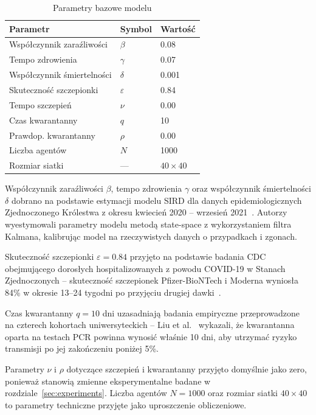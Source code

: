 \documentclass[polish]{projectreport}
\begin{document}
\begin{table}[H]
\centering
\caption{Parametry bazowe modelu}
\begin{tabularx}{\columnwidth}{@{}llY@{}} \toprule
\textbf{Parametr} & \textbf{Symbol} & \textbf{Wartość} \\ \midrule
Współczynnik zaraźliwości  & $\beta$    & 0.08 \\
Tempo zdrowienia           & $\gamma$   & 0.07 \\
Współczynnik śmiertelności & $\delta$   & 0.001 \\
Skuteczność szczepionki    & $\varepsilon$ & 0.84 \\
Tempo szczepień            & $\nu$      & 0.00 \\
Czas kwarantanny           & $q$        & 10 \\
Prawdop. kwarantanny       & $\rho$     & 0.00 \\
Liczba agentów             & $N$        & 1000 \\
Rozmiar siatki             & ---        & $40 \times 40$ \\
\bottomrule
\end{tabularx}
\label{tab:parameters}
\end{table}

Współczynnik zaraźliwości $\beta$, tempo zdrowienia $\gamma$ oraz
współczynnik śmiertelności $\delta$ dobrano na podstawie estymacji
modelu SIRD dla danych epidemiologicznych Zjednoczonego Królestwa
z okresu kwiecień 2020 -- wrzesień 2021~\cite{alencar2022uk}.
Autorzy wyestymowali parametry modelu metodą state-space z wykorzystaniem
filtra Kalmana, kalibrując model na rzeczywistych danych o przypadkach
i zgonach.

Skuteczność szczepionki $\varepsilon = 0.84$ przyjęto na podstawie
badania CDC obejmującego dorosłych hospitalizowanych z powodu
COVID-19 w Stanach Zjednoczonych -- skuteczność szczepionek
Pfizer-BioNTech i Moderna wyniosła 84\% w okresie 13--24 tygodni
po przyjęciu drugiej dawki~\cite{taubenberger2021mmwr}.

Czas kwarantanny $q = 10$ dni uzasadniają badania empiryczne
przeprowadzone na czterech kohortach uniwersyteckich -- Liu
et al.~\cite{liu2022quarantine} wykazali, że kwarantanna oparta
na testach PCR powinna wynosić właśnie 10 dni, aby utrzymać
ryzyko transmisji po jej zakończeniu poniżej 5\%.

Parametry $\nu$ i $\rho$ dotyczące szczepień i kwarantanny
przyjęto domyślnie jako zero, ponieważ stanowią zmienne
eksperymentalne badane w rozdziale~\ref{sec:experiments}.
Liczba agentów $N = 1000$ oraz rozmiar siatki $40 \times 40$
to parametry techniczne przyjęte jako uproszczenie obliczeniowe.
\end{document}
